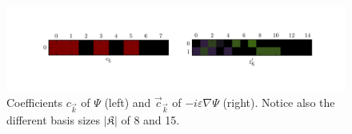 \begin{figure}
  \centering
  \includegraphics[scale=0.6]{./fig/wavepacket_coefficients.pdf}
  \caption[Coefficients of the gradient example]
         {Coefficients $c_{\vec{k}}$ of $\Psi$ (left) and $\vec{c}_{\vec{k}}$ of
          $-i \varepsilon \nabla \Psi$ (right). Notice also the different basis
          sizes $|\mathfrak{K}|$ of 8 and 15.}
  \label{fig:wavepacket_coefficients}
\end{figure}

